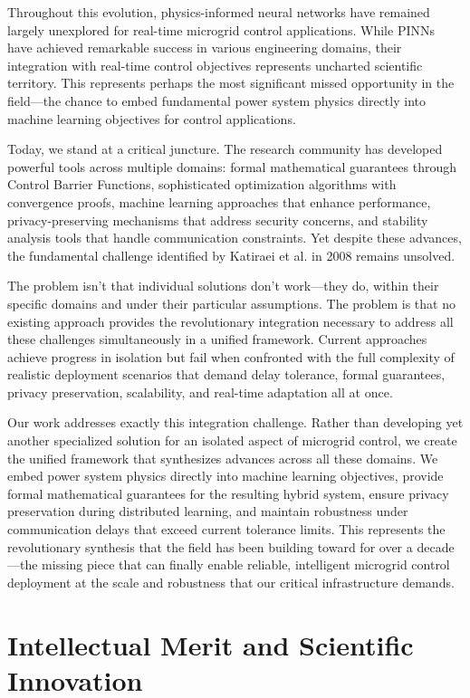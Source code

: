 \documentclass[12pt]{article}
\begin{document}
Throughout this evolution, physics-informed neural networks have remained largely unexplored for real-time microgrid control applications. While PINNs have achieved remarkable success in various engineering domains, their integration with real-time control objectives represents uncharted scientific territory. This represents perhaps the most significant missed opportunity in the field—the chance to embed fundamental power system physics directly into machine learning objectives for control applications.

Today, we stand at a critical juncture. The research community has developed powerful tools across multiple domains: formal mathematical guarantees through Control Barrier Functions, sophisticated optimization algorithms with convergence proofs, machine learning approaches that enhance performance, privacy-preserving mechanisms that address security concerns, and stability analysis tools that handle communication constraints. Yet despite these advances, the fundamental challenge identified by Katiraei et al. in 2008 remains unsolved.

The problem isn't that individual solutions don't work—they do, within their specific domains and under their particular assumptions. The problem is that no existing approach provides the revolutionary integration necessary to address all these challenges simultaneously in a unified framework. Current approaches achieve progress in isolation but fail when confronted with the full complexity of realistic deployment scenarios that demand delay tolerance, formal guarantees, privacy preservation, scalability, and real-time adaptation all at once.

Our work addresses exactly this integration challenge. Rather than developing yet another specialized solution for an isolated aspect of microgrid control, we create the unified framework that synthesizes advances across all these domains. We embed power system physics directly into machine learning objectives, provide formal mathematical guarantees for the resulting hybrid system, ensure privacy preservation during distributed learning, and maintain robustness under communication delays that exceed current tolerance limits. This represents the revolutionary synthesis that the field has been building toward for over a decade—the missing piece that can finally enable reliable, intelligent microgrid control deployment at the scale and robustness that our critical infrastructure demands.

\section{Intellectual Merit and Scientific Innovation}
\end{document}
